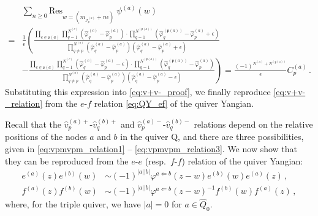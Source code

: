 \documentclass[12pt,a4paper]{article}
\newcounter{subsubsubsection}[subsubsection]
\renewcommand{\(}{\left(}
\renewcommand{\)}{\right)}
\newcommand{\eps}{\epsilon}
\renewcommand{\(}{\left(}
\renewcommand{\)}{\right)}
\begin{document}
\begin{equation}
\begin{aligned}
&\sum_{n\geq0}\text{Res}_{w=(m_{\mathcal{I}^{(a)}_{p}}+n\epsilon)}\ \psi^{(a)}(w)\\
=&
\frac{1}{\epsilon}\left(\frac{\prod_{c\in \mathfrak{s}(a)}\prod_{q=1}^{N^{(c)}}(\hat{\varphi}^{(c)}_{q}-\hat{\varphi}^{(a)}_{p})\cdot\prod_{q=1}^{N^{(\mathfrak{p}(a))}}(\hat{\varphi}^{(\mathfrak{p}(a))}_{q}-\hat{\varphi}^{(a)}_{p}+\epsilon)}{\prod_{q\neq p}^{N^{(a)}}(\hat{\varphi}^{(a)}_{q}-\hat{\varphi}^{(a)}_{p})(\hat{\varphi}^{(a)}_{q}-\hat{\varphi}^{(a)}_{p}+\epsilon)}\right.\\
&-\left.\frac{\prod_{c\in \mathfrak{s}(a)}\prod_{q=1}^{N^{(c)}}(\hat{\varphi}^{(c)}_{q}-\hat{\varphi}^{(a)}_{p}-\eps)\cdot\prod_{q=1}^{N^{(\mathfrak{p}(a))}}(\hat{\varphi}^{(\mathfrak{p}(a))}_{q}-\hat{\varphi}^{(a)}_{p})}{\prod_{q\neq p}^{N^{(a)}}(\hat{\varphi}^{(a)}_{q}-\hat{\varphi}^{(a)}_{p})(\hat{\varphi}^{(a)}_{q}-\hat{\varphi}^{(a)}_{p}-\epsilon)}\right)
= \frac{(-1)^{N^{(a)}+N^{(\mathfrak{p}(a))}}}{\epsilon} C^{(a)}_p\,.
\end{aligned}
\end{equation}
Substituting this expression into \eqref{eq:v+v-_proof}, we finally reproduce \eqref{eq:v+v-_relation} from the $e$-$f$ relation \eqref{eq:QY_ef} of the quiver Yangian.



Recall that the $\hat{v}^{(a)+}_p$-$\hat{v}^{(b)+}_q$ and $\hat{v}^{(a)-}_p$-$\hat{v}^{(b)-}_q$ relations depend on the relative positions of the nodes $a$ and $b$ in the quiver $\mathrm{Q}$, and there are three possibilities, given in \eqref{eq:vpmvpm_relation1} -- \eqref{eq:vpmvpm_relation3}. 
We now show that they can be reproduced from the $e$-$e$ (resp.\ $f$-$f$) relation of the quiver Yangian:
\begin{equation}\label{eq:QY_ee}
\begin{aligned}
e^{(a)}(z)e^{(b)}(w)&\sim (-1)^{|a||b|}\varphi^{a\Leftarrow b}(z-w)e^{(b)}(w)e^{(a)}(z)\,,  \\
f^{(a)}(z)f^{(b)}(w)&\sim (-1)^{|a||b|}\varphi^{a\Leftarrow b}(z-w)^{-1}f^{(b)}(w)f^{(a)}(z)\,,
\end{aligned}
\end{equation}
where, for the triple quiver, we have $|a|=0$ for $a\in\widehat{Q}_0$.
\end{document}
